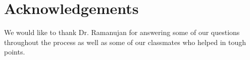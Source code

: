 
\section{Acknowledgements}
\label{sec:ack}

We would like to thank Dr. Ramanujan for answering some of our questions
throughout the process as well as some of our classmates who helped in tough
points. 
